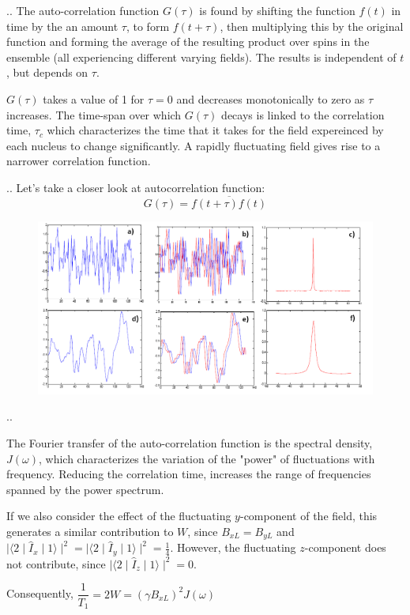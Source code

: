 \documentclass{beamer}
\begin{document}
\begin{frame}{\thesection.\thesubsection. \insertsubsection}
	The auto-correlation function $G(\tau)$ is found by shifting the function $f(t)$ in time by the an amount $\tau$, to form $f(t + \tau)$, then multiplying this by the original function and forming the average of the resulting product over spins in the ensemble (all experiencing different varying fields). The results is independent of $t$, but depends on $\tau$.
	
	$G(\tau)$ takes a value of 1 for $\tau = 0$ and decreases monotonically to zero as $\tau$ increases. The time-span over which $G(\tau)$ decays is linked to the correlation time, $\tau_c$ which characterizes the time that it takes for the field expereinced by each nucleus to change significantly. A rapidly fluctuating field gives rise to a narrower correlation function. 
\end{frame}		
	

\begin{frame}{\thesection.\thesubsection. \insertsubsection}	
   Let's take a closer look at \alert{autocorrelation function}:
   \begin{equation*}
     G(\tau) = \overline{f(t+ \tau) f(t)}
   \end{equation*}

  \begin{figure}
  	\centering
  	\includegraphics[scale=0.4]{figures/correlation_function.png}
  \end{figure}
\end{frame}

\begin{frame}{\thesection.\thesubsection. \insertsubsection}

	The Fourier transfer of the auto-correlation function is the \alert{spectral density}, $J(\omega)$, which characterizes the variation of the "power" of fluctuations with frequency. Reducing the correlation time, increases the range of frequencies spanned by the power spectrum.
	
	If we also consider the effect of the fluctuating $y$-component of the field, this generates a similar contribution to $W$, since $B_{xL} = B_{yL}$ and $ \mid \langle 2 \mid \hat{I}_x \mid 1 \rangle \mid^2 = \mid \langle 2 \mid \hat{I}_y \mid 1 \rangle \mid^2 = \frac{1}{4}$. However, the fluctuating $z$-component does not contribute, since  $ \mid \langle 2 \mid \hat{I}_z \mid 1 \rangle \mid^2 = 0 $.
	
	Consequently, $\dfrac{1}{T_1} = 2 W = (\gamma B_{xL})^2 J(\omega)$
\end{frame}
\end{document}

